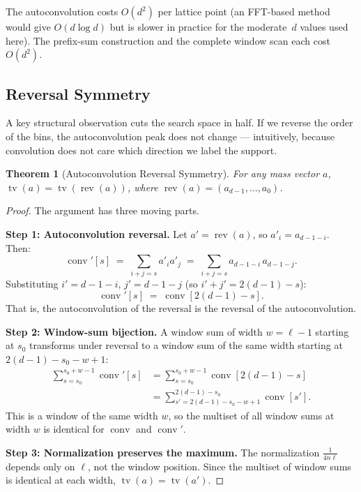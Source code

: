 \documentclass[11pt, letterpaper]{article}
\theoremstyle{paperplain}
\newtheorem{theorem}{Theorem}[section]
\theoremstyle{paperdef}
\newcommand{\tv}{\operatorname{tv}}
\newcommand{\rev}{\operatorname{rev}}
\newcommand{\conv}{\operatorname{conv}}
\begin{document}
The autoconvolution costs $O(d^2)$ per lattice point (an FFT-based
method would give $O(d \log d)$ but is slower in practice for the
moderate~$d$ values used here).  The prefix-sum construction and the
complete window scan each cost $O(d^2)$.

\subsection{Reversal Symmetry}\label{subsec:reversal}

A key structural observation cuts the search space in half.  If we
reverse the order of the bins, the autoconvolution peak does not change
--- intuitively, because convolution does not care which direction we
label the support.

\begin{theorem}[Autoconvolution Reversal Symmetry]
\label{thm:reversal}
For any mass vector $a$, $\tv(a) = \tv(\rev(a))$, where
$\rev(a) = (a_{d-1}, \ldots, a_0)$.
\end{theorem}

\begin{proof}
The argument has three moving parts.

\medskip
\noindent\textbf{Step 1: Autoconvolution reversal.}
Let $a' = \rev(a)$, so $a'_i = a_{d-1-i}$.  Then:
\[
  \conv'[s]
  \;=\; \sum_{i+j=s} a'_i a'_j
  \;=\; \sum_{i+j=s} a_{d-1-i}\, a_{d-1-j}.
\]
Substituting $i' = d-1-i$, $j' = d-1-j$ (so $i'+j' = 2(d-1) - s$):
\[
  \conv'[s] \;=\; \conv[2(d-1) - s].
\]
That is, the autoconvolution of the reversal is the reversal of the
autoconvolution.

\medskip
\noindent\textbf{Step 2: Window-sum bijection.}
A window sum of width $w = \ell - 1$ starting at $s_0$ transforms
under reversal to a window sum of the same width starting at
$2(d-1) - s_0 - w + 1$:
\begin{align*}
  \sum_{s=s_0}^{s_0+w-1} \conv'[s]
  &= \sum_{s=s_0}^{s_0+w-1} \conv[2(d-1)-s] \\
  &= \sum_{s'=2(d-1)-s_0-w+1}^{2(d-1)-s_0} \conv[s'].
\end{align*}
This is a window of the same width $w$, so the multiset of all window
sums at width $w$ is identical for $\conv$ and $\conv'$.

\medskip
\noindent\textbf{Step 3: Normalization preserves the maximum.}
The normalization $\tfrac{1}{4n\ell}$ depends only on $\ell$, not the
window position.  Since the multiset of window sums is identical at
each width, $\tv(a) = \tv(a')$.
\end{proof}
\end{document}
